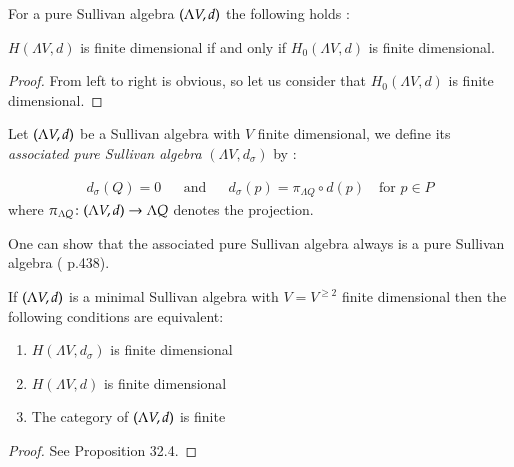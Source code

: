 \begin{Proposition}
\label{prop:FiniteDimensionDependentOnDegreeOne}
 For a pure Sullivan algebra $(\Lambda V,d)$ the following holds :
 
  $H(\Lambda V,d)$ is finite dimensional if and only if $H_0(\Lambda V,d)$ is finite dimensional.
 
\end{Proposition}

\begin{proof}
 From left to right is obvious, so let us consider that $H_0(\Lambda V,d)$ is finite dimensional.
\end{proof}

\begin{Definition}
 Let $(\Lambda V,d)$ be a Sullivan algebra with $V$ finite dimensional, we define its 
 \emph{associated pure Sullivan algebra} $(\Lambda V, d_{\sigma})$ by :
 
 \begin{align*}
  d_{\sigma} (Q) = 0 & & \text{and} & & d_{\sigma}(p) = \pi_{\Lambda Q} \circ d(p) \quad \text{for $p \in P$}
 \end{align*}
 where $\pi_{\Lambda Q} \colon (\Lambda V,d) \to \Lambda Q$ denotes the projection.
 \end{Definition}

 One can show that the associated pure Sullivan algebra always is a pure Sullivan algebra ( \cite{Felix2001} p.438).

\begin{Proposition}
\label{prop:EquivalenceFiniteDimensionCategoryCohomology}
 If $(\Lambda V,d)$ is a minimal Sullivan algebra with $V = V^{\geq 2}$ finite dimensional then the following conditions
 are equivalent:
 
 \begin{enumerate}
  \item $H(\Lambda V, d_{\sigma})$ is finite dimensional
  \item $H(\Lambda V, d)$ is finite dimensional
  \item The category of $(\Lambda V,d)$ is finite
 \end{enumerate}

\end{Proposition}

\begin{proof}
 See \cite{Felix2001} Proposition 32.4.
\end{proof}
